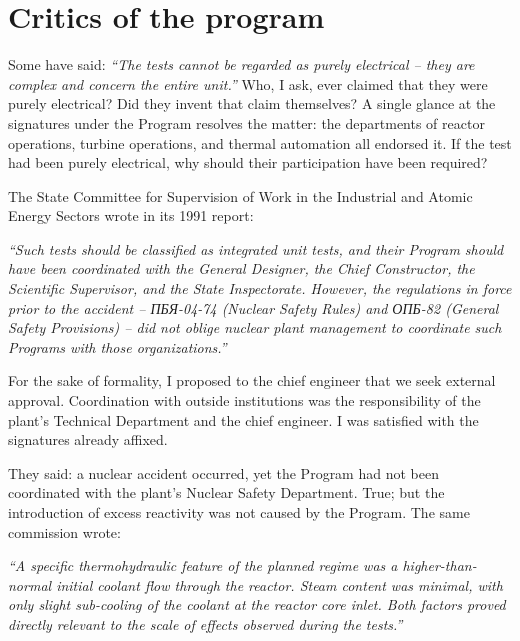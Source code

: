 \documentclass[openright]{bookest}
\begin{document}
\section{Critics of the program}

Some have said: \textit{``The tests cannot be regarded as purely electrical -- they are complex and concern the entire unit.''}
Who, I ask, ever claimed that they were purely electrical? Did they invent that claim themselves? A single glance at the signatures under the Program resolves the matter: the departments of reactor operations, turbine operations, and thermal automation all endorsed it. If the test had been purely electrical, why should their participation have been required?

The State Committee for Supervision of Work in the Industrial and Atomic Energy Sectors wrote in its 1991 report:

\begin{personal}
\textit{``Such tests should be classified as integrated unit tests, and their Program should have been coordinated with the General Designer, the Chief Constructor, the Scientific Supervisor, and the State Inspectorate. However, the regulations in force prior to the accident -- ПБЯ-04-74 (Nuclear Safety Rules) and ОПБ-82 (General Safety Provisions) -- did not oblige nuclear plant management to coordinate such Programs with those organizations.''}
\end{personal}

For the sake of formality, I proposed to the chief engineer that we seek external approval. Coordination with outside institutions was the responsibility of the plant's Technical Department and the chief engineer. I was satisfied with the signatures already affixed.

They said: a nuclear accident occurred, yet the Program had not been coordinated with the plant's Nuclear Safety Department. True; but the introduction of excess reactivity was not caused by the Program. The same commission wrote:

\begin{personal}
\textit{``A specific thermohydraulic feature of the planned regime was a higher-than-normal initial coolant flow through the reactor. Steam content was minimal, with only slight sub-cooling of the coolant at the reactor core inlet. Both factors proved directly relevant to the scale of effects observed during the tests.''}
\end{personal}
\end{document}
